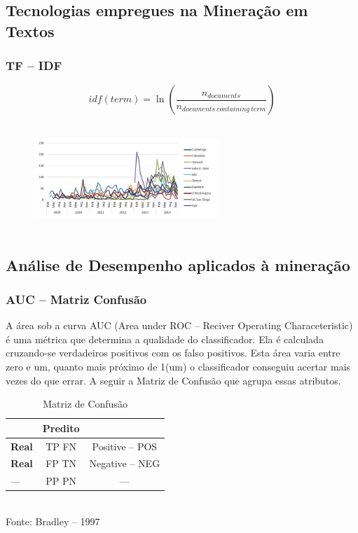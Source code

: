 \documentclass[11pt]{beamer}
\begin{document}

\subsection{ Tecnologias empregues na Mineração em Textos}

\begin{frame}\frametitle{ TF -- IDF}
	\transdissolve[duration=1, direction=25]
	\begin{equation}
		idf(term) = \ln(\frac{n_{documents}}{n_{documents\  containing \ term}})
	\end{equation}
	\pause
	\begin{figure}[!ht]
	 		\includegraphics[width=70mm, height=40mm]{Figuras/BigData/ferqPalavrasG.png}
	\end{figure}
\end{frame}

\subsection{ Análise de Desempenho aplicados à mineração}
\begin{frame}\frametitle{AUC -- Matriz Confusão}

	A área sob a curva AUC (Area under ROC -- Reciver Operating Characeteristic) é uma métrica que determina a qualidade do classificador.
	Ela é calculada cruzando-se verdadeiros positivos com os falso positivos. 
	Esta área varia entre zero e um, quanto mais próximo de 1(um) o classificador conseguiu acertar mais vezes do que errar.
	A seguir a Matriz de Confusão que agrupa essas atributos.
	\begin{table}[ht]
		\centering
		\caption{Matriz de Confusão}
		\vspace{1mm}
		\begin{tabular}{l|c|c}
			\hline
			\textbf{} & \textbf{Predito} & \textbf{}\\
			\hline
			\textbf{Real}  & TP   FN & Positive -- POS\\
			\textbf{Real}  & FP   TN & Negative -- NEG\\
			\hline
			---         & PP   PN &    ---         \\
		\end{tabular}
		\\
		\tiny Fonte: Bradley -- 1997
	\end{table}
\end{frame}
\end{document}

